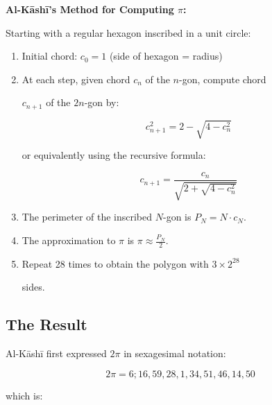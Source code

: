 \documentclass[11pt,a4paper]{article}
\newenvironment{mathalgo}{%

  \par\vspace{0.3cm}

  \begin{framed}

  \setlength{\parindent}{0pt}

}{%

  \end{framed}

  \par\vspace{0.3cm}

}
\begin{document}
\begin{mathalgo}

\textbf{Al-K\=ash\=i's Method for Computing $\pi$:}



Starting with a regular hexagon inscribed in a unit circle:

\begin{enumerate}[nosep]

  \item Initial chord: $c_0 = 1$ (side of hexagon = radius)

  \item At each step, given chord $c_n$ of the $n$-gon, compute chord

  $c_{n+1}$ of the $2n$-gon by:

    \[

    c_{n+1}^2 = 2 - \sqrt{4 - c_n^2}

    \]

  or equivalently using the recursive formula:

    \[

    c_{n+1} = \frac{c_n}{\sqrt{2 + \sqrt{4 - c_n^2}}}

    \]

  \item The perimeter of the inscribed $N$-gon is $P_N = N \cdot

  c_N$.

  \item The approximation to $\pi$ is $\pi \approx \frac{P_N}{2}$.

  \item Repeat 28 times to obtain the polygon with $3 \times 2^{28}$

  sides.

\end{enumerate}

\end{mathalgo}



\subsection{The Result}



Al-K\=ash\=i first expressed $2\pi$ in sexagesimal notation:

\[

2\pi = 6; 16, 59, 28, 1, 34, 51, 46, 14, 50

\]

which is:
\end{document}
